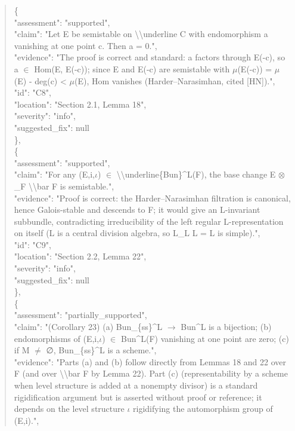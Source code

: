 \documentclass[11pt]{article}
\begin{document}
\begin{quote}
    \{\\
      "assessment": "supported",\\
      "claim": "Let E be semistable on \textbackslash{}\textbackslash{}underline C with endomorphism a vanishing at one point c. Then a = 0.",\\
      "evidence": "The proof is correct and standard: a factors through E(-c), so a \ensuremath{\in} Hom(E, E(-c)); since E and E(-c) are semistable with \ensuremath{\mu}(E(-c)) = \ensuremath{\mu}(E) - deg(c) < \ensuremath{\mu}(E), Hom vanishes (Harder--Narasimhan, cited [HN]).",\\
      "id": "C8",\\
      "location": "Section 2.1, Lemma 18",\\
      "severity": "info",\\
      "suggested\_fix": null\\
    \},\\
    \{\\
      "assessment": "supported",\\
      "claim": "For any (E,i,\ensuremath{\iota}) \ensuremath{\in} \textbackslash{}\textbackslash{}underline\{Bun\}\^{}L(F), the base change E \ensuremath{\otimes}\_F \textbackslash{}\textbackslash{}bar F is semistable.",\\
      "evidence": "Proof is correct: the Harder--Narasimhan filtration is canonical, hence Galois-stable and descends to F; it would give an L-invariant subbundle, contradicting irreducibility of the left regular L-representation on itself (L is a central division algebra, so L\_L L = L is simple).",\\
      "id": "C9",\\
      "location": "Section 2.2, Lemma 22",\\
      "severity": "info",\\
      "suggested\_fix": null\\
    \},\\
    \{\\
      "assessment": "partially\_supported",\\
      "claim": "(Corollary 23) (a) Bun\_\{ss\}\^{}L \ensuremath{\to} Bun\^{}L is a bijection; (b) endomorphisms of (E,i,\ensuremath{\iota}) \ensuremath{\in} Bun\^{}L(F) vanishing at one point are zero; (c) if M \ensuremath{\ne} ∅, Bun\_\{ss\}\^{}L is a scheme.",\\
      "evidence": "Parts (a) and (b) follow directly from Lemmas 18 and 22 over F (and over \textbackslash{}\textbackslash{}bar F by Lemma 22). Part (c) (representability by a scheme when level structure is added at a nonempty divisor) is a standard rigidification argument but is asserted without proof or reference; it depends on the level structure \ensuremath{\iota} rigidifying the automorphism group of (E,i).",\\

\end{quote}
\end{document}
